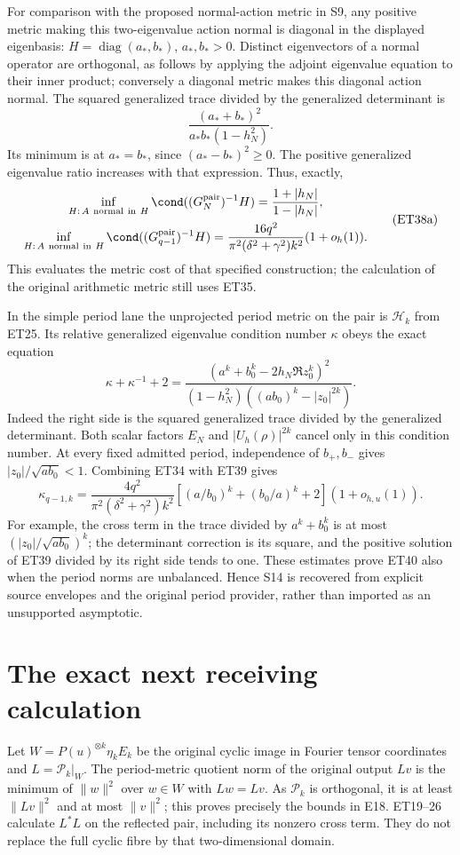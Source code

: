 \documentclass[11pt,a4paper]{article}
\begin{document}
For comparison with the proposed normal-action metric in S9, any
positive metric making this two-eigenvalue action normal is diagonal
in the displayed eigenbasis: \(H=\operatorname{diag}(a_*,b_*)\),
\(a_*,b_*>0\). Distinct eigenvectors of a normal operator are
orthogonal, as follows by applying the adjoint eigenvalue equation
to their inner product; conversely a diagonal metric makes this
diagonal action normal. The squared generalized trace divided by
the generalized determinant is
\[
 \frac{(a_*+b_*)^2}{a_*b_*(1-h_N^2)}.
\]
Its minimum is at \(a_*=b_*\), since
\((a_*-b_*)^2\ge0\). The positive generalized eigenvalue ratio
increases with that expression. Thus, exactly,
\[
\begin{gathered}\inf_{H:\,A\ {\rm normal\ in}\ H}
 \cond((G_N^{\rm pair})^{-1}H)
   =\frac{1+|h_N|}{1-|h_N|},\\
 \inf_{H:\,A\ {\rm normal\ in}\ H}
 \cond((G_{q-1}^{\rm pair})^{-1}H)
 =\frac{16q^2}{\pi^2(\delta^2+\gamma^2)k^2}
                                             (1+o_h(1)).\end{gathered} \tag{ET38a}
\]
This evaluates the metric cost of that specified construction; the
calculation of the original arithmetic metric still uses ET35.

In the simple period lane the unprojected period metric on the pair
is \(\mathcal H_k\) from ET25. Its relative generalized eigenvalue
condition number \(\kappa\) obeys the exact equation
\[
 \kappa+\kappa^{-1}+2=
 \frac{(a^k+b_0^k-2h_N\Re z_0^k)^2}
 {(1-h_N^2)((ab_0)^k-|z_0|^{2k})}.                  \tag{ET39}
\]
Indeed the right side is the squared generalized trace divided by
the generalized determinant. Both scalar factors
\(E_N\) and \(|U_h(\rho)|^{2k}\) cancel only in this condition number.
At every fixed admitted period, independence of \(b_+,b_-\) gives
\(|z_0|/\sqrt{ab_0}<1\). Combining ET34 with ET39 gives
\[
 \kappa_{q-1,k}=
 \frac{4q^2}{\pi^2(\delta^2+\gamma^2)k^2}
 \left[(a/b_0)^k+(b_0/a)^k+2\right](1+o_{h,u}(1)).
                                                               \tag{ET40}
\]
For example, the cross term in the trace divided by
\(a^k+b_0^k\) is at most
\((|z_0|/\sqrt{ab_0})^k\); the determinant correction is its
square, and the positive solution of ET39 divided by its right
side tends to one. These estimates prove ET40 also when the period
norms are unbalanced. Hence S14 is recovered from explicit source
envelopes and the original period provider, rather than imported
as an unsupported asymptotic.

\section{The exact next receiving calculation}
Let \(W=P(u)^{\otimes k}\eta_kE_k\) be the original cyclic image
in Fourier tensor coordinates and \(L=\mathcal P_k|_W\).
The period-metric quotient norm of the original output \(Lv\) is
the minimum of \(\|w\|^2\) over \(w\in W\) with \(Lw=Lv\).
As \(\mathcal P_k\) is orthogonal, it is at least \(\|Lv\|^2\)
and at most \(\|v\|^2\); this proves precisely the bounds in E18.
ET19--26 calculate \(L^*L\) on the reflected pair, including its
nonzero cross term. They do not replace the full cyclic fibre by
that two-dimensional domain.
\end{document}
